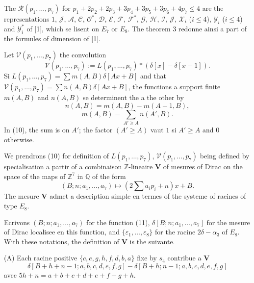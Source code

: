 \documentclass[11pt,a4paper]{article}
\theoremstyle{plain}
\theoremstyle{definition}
\begin{document}
The $\mathcal{R}(p_1,\dots,p_7)$ for $p_1 + 2p_2 + 2p_3 + 3p_4 + 3p_5 + 3p_6 + 4p_7 \leq 4$ are the representations $1$, $\mathcal{J}$, $\mathcal{A}$, $\mathcal{C}$, $\mathcal{O}^*$, $\mathcal{D}$, $\mathcal{E}$, $\mathcal{F}$, $\mathcal{F}^*$, $\mathcal{G}$, $\mathcal{H}$, $\mathcal{I}$, $\mathcal{J}$, $\mathcal{X}_i$ ($i \leq 4$), $\mathcal{Y}_i$ ($i \leq 4$) and $\mathcal{Y}_i^*$ of [1], which se lisent on $E_7$ or $E_8$. The theorem 3 redonne ainsi a part of the formules of dimension of [1].

\smallskip

Let $\mathcal{V}(p_1,\dots,p_7)$ the convolution
\begin{equation}\label{eq:8}
\mathcal{V}(p_1,\dots,p_7) := L(p_1,\dots,p_7) * (\delta[x] - \delta[x-1]).
\end{equation}
Si $L(p_1,\dots,p_7) = \sum m(A,B)\delta[Ax + B]$ and that $\mathcal{V}(p_1,\dots,p_7) = \sum n(A,B)\delta[Ax + B]$, the functions a support finite $m(A,B)$ and $n(A,B)$ se determinent the a the other by
\begin{equation}\label{eq:9}
n(A,B) = m(A,B) - m(A+1,B),
\end{equation}
\begin{equation}\label{eq:10}
m(A,B) = \sum_{A' \geq A} n(A',B).
\end{equation}
In (10), the sum is on $A'$; the factor $(A' \geq A)$ vaut $1$ si $A' \geq A$ and $0$ otherwise.

We prendrons (10) for definition of $L(p_1,\dots,p_7)$, $\mathcal{V}(p_1,\dots,p_7)$ being defined by specialisation a partir of a combinaison $\mathbb{Z}$-lineaire $\mathbf{V}$ of mesures of Dirac on the space of the maps of $\mathbb{Z}^7$ in $\mathbb{Q}$ of the form
\begin{equation}\label{eq:11}
(B; n; a_1,\dots,a_7) \mapsto (2\textstyle\sum a_i p_i + n)x + B.
\end{equation}
The mesure $\mathbf{V}$ admet a description simple en termes of the systeme of racines of type $E_8$.

Ecrivons $(B; n; a_1,\dots,a_7)$ for the function (11), $\delta[B; n; a_1,\dots,a_7]$ for the mesure of Dirac localisee en this function, and $\{\varepsilon_1,\dots,\varepsilon_8\}$ for the racine $2\delta - \alpha_3$ of $E_8$. With these notations, the definition of $\mathbf{V}$ is the suivante.

\smallskip

(A) Each racine positive $\{c, e, g, h, f, d, b, a\}$ fixe by $s_4$ contribue a $\mathbf{V}$
\[
\delta[B+h+n-1; a,b,c,d,e,f,g] - \delta[B+h; n-1; a,b,c,d,e,f,g]
\]
avcc $5h + n = a + b + c + d + e + f + g + h$.
\end{document}
